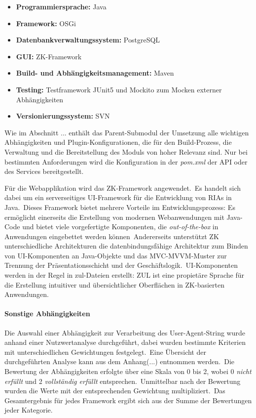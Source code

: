 \begin{itemize}
	\item \textbf{Programmiersprache:} Java
	\item \textbf{Framework:} OSGi
	\item \textbf{Datenbankverwaltungssystem:} PostgreSQL
	\item \textbf{GUI:} ZK-Framework
	\item \textbf{Build- und Abhängigkeitsmanagement:} Maven
	\item \textbf{Testing:} Testframework JUnit5 und Mockito zum Mocken externer Abhängigkeiten
	\item \textbf{Versionierungssystem:} SVN
\end{itemize}

Wie im Abschnitt ... enthält das Parent-Submodul der Umsetzung alle wichtigen Abhängigkeiten und Plugin-Konfigurationen, die für den Build-Prozess, die Verwaltung und die Bereitstellung des Moduls von hoher Relevanz sind.
Nur bei bestimmten Anforderungen wird die Konfiguration in der \textit{pom.xml} der API oder des Services bereitgestellt.

Für die Webapplikation wird das ZK-Framework angewendet.\ Es handelt sich dabei um ein serverseitiges UI-Framework für die Entwicklung von RIAs in Java.\ Dieses Framework bietet mehrere Vorteile im Entwicklungsprozess: Es ermöglicht
einerseits die Erstellung von modernen Webanwendungen mit Java-Code und bietet viele vorgefertigte Komponenten, die \textit{out-of-the-box} in Anwendungen eingebettet werden können\ Andererseits unterstützt ZK unterschiedliche
Architekturen \zB die datenbindungsfähige Architektur zum Binden von UI-Komponenten an Java-Objekte und das MVC-\bzw MVVM-Muster zur Trennung der Präsentationsschicht und der Geschäftslogik.\ UI-Komponenten werden in der Regel in
zul-Dateien erstellt: ZUL ist eine propietäre Sprache für die Erstellung intuitiver und übersichtlicher Oberflächen in ZK-basierten Anwendungen.

\paragraph{Sonstige Abhängigkeiten}
\label{par:Abhaengigkeiten}

Die Auswahl einer Abhängigkeit zur Verarbeitung des User-Agent-String wurde anhand einer Nutzwertanalyse durchgeführt, dabei wurden bestimmte Kriterien mit unterschiedlichen Gewichtungen festgelegt.\ Eine Übersicht der durchgeführten
Analyse kann aus dem Anhang(...) entnommen werden.\ Die Bewertung der Abhängigkeiten erfolgte über eine Skala von 0 bis 2, wobei 0 \textit{nicht erfüllt} und 2 \textit{vollständig erfüllt} entsprechen.\ Unmittelbar nach der Bewertung wurden
die Werte mit der entsprechenden Gewichtung multipliziert.\ Das Gesamtergebnis für jedes Framework ergibt sich aus der Summe der Bewertungen jeder Kategorie.

